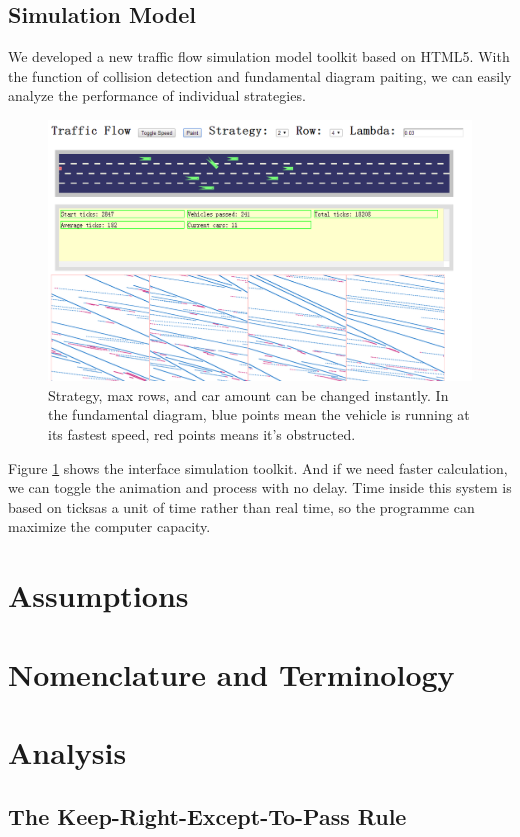 \subsection{Simulation Model}
We developed a new traffic flow simulation model toolkit based on HTML5. With the function of collision detection and fundamental diagram paiting, we can easily analyze the performance of individual strategies. 
\begin{figure}[htbp]
  \centering
  \includegraphics[width=.8\textwidth]{./img/simulationmodel.png}
  \caption{Strategy, max rows, and car amount can be changed instantly. In the fundamental diagram, blue points mean the vehicle is running at its fastest speed, red points means it's obstructed. }
  \label{fig:simulationmodel}
\end{figure}

Figure \ref{fig:simulationmodel} shows the interface simulation toolkit. And if we need faster calculation, we can toggle the animation and process with no delay. Time inside this system is based on ticksas a unit of time rather than real time, so the programme can maximize the computer capacity. 

\section{Assumptions}

\section{Nomenclature and Terminology}

\section{Analysis}
\subsection{The Keep-Right-Except-To-Pass Rule}

